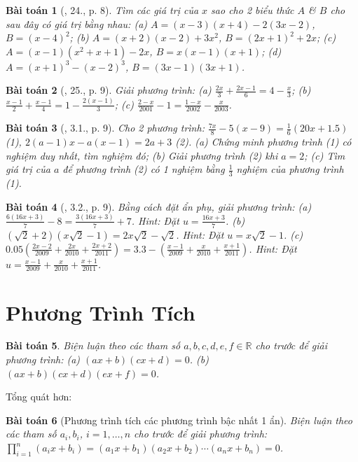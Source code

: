 \documentclass{article}
\newtheorem{baitoan}{Bài toán}
\begin{document}
\begin{baitoan}[\cite{SBT_Toan_8_tap_2}, 24., p. 8]
	Tìm các giá trị của $x$ sao cho 2 biểu thức $A$ \& $B$ cho sau đây có giá trị bằng nhau: (a) $A = (x - 3)(x + 4) - 2(3x - 2)$, $B = (x - 4)^2$; (b) $A = (x + 2)(x - 2) + 3x^2$, $B = (2x + 1)^2 + 2x$; (c) $A = (x - 1)(x^2 + x + 1) - 2x$, $B = x(x - 1)(x + 1)$; (d) $A = (x + 1)^3 - (x - 2)^3$, $B = (3x - 1)(3x + 1)$.
\end{baitoan}

\begin{baitoan}[\cite{SBT_Toan_8_tap_2}, 25., p. 9]
	Giải phương trình: (a) $\frac{2x}{3} + \frac{2x - 1}{6} = 4 - \frac{x}{3}$; (b) $\frac{x - 1}{2} + \frac{x - 1}{4} = 1 - \frac{2(x - 1)}{3}$; (c) $\frac{2 - x}{2001} - 1 = \frac{1 - x}{2002} - \frac{x}{2003}$.
\end{baitoan}

\begin{baitoan}[\cite{SBT_Toan_8_tap_2}, 3.1., p. 9]
	Cho 2 phương trình: $\frac{7x}{8} - 5(x - 9) = \frac{1}{6}(20x + 1.5)$ (1), $2(a - 1)x - a(x - 1) = 2a + 3$ (2). (a) Chứng minh phương trình (1) có nghiệm duy nhất, tìm nghiệm đó; (b) Giải phương trình (2) khi $a = 2$; (c) Tìm giá trị của $a$ để phương trình (2) có 1 nghiệm bằng $\frac{1}{3}$ nghiệm của phương trình (1).
\end{baitoan}

\begin{baitoan}[\cite{SBT_Toan_8_tap_2}, 3.2., p. 9]
	Bằng cách đặt ẩn phụ, giải phương trình: (a) $\frac{6(16x + 3)}{7} - 8 = \frac{3(16x + 3)}{7} + 7$. Hint: Đặt $u = \frac{16x + 3}{7}$. (b) $(\sqrt{2} + 2)(x\sqrt{2} - 1) = 2x\sqrt{2} - \sqrt{2}$. Hint: Đặt $u = x\sqrt{2} - 1$. (c) $0.05\left(\frac{2x - 2}{2009} + \frac{2x}{2010} + \frac{2x + 2}{2011}\right) = 3.3 - \left(\frac{x - 1}{2009} + \frac{x}{2010} + \frac{x + 1}{2011}\right)$. Hint: Đặt $u = \frac{x - 1}{2009} + \frac{x}{2010} + \frac{x + 1}{2011}$.
\end{baitoan}


\section{Phương Trình Tích}

\begin{baitoan}
	Biện luận theo các tham số $a,b,c,d,e,f\in\mathbb{R}$ cho trước để giải phương trình: (a) $(ax + b)(cx + d) = 0$. (b) $(ax + b)(cx + d)(ex + f) = 0$.
\end{baitoan}
Tổng quát hơn:
\begin{baitoan}[Phương trình tích các phương trình bậc nhất 1 ẩn]
	Biện luận theo các tham số $a_i,b_i$, $i = 1,\ldots,n$ cho trước để giải phương trình: $\prod_{i=1}^n (a_ix + b_i) = (a_1x + b_1)(a_2x + b_2)\cdots(a_nx + b_n) = 0$.
\end{baitoan}
\end{document}
